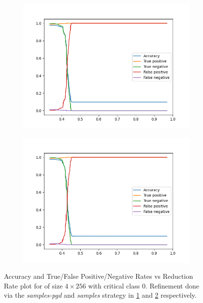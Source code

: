 \begin{figure}
    \begin{subfigure}{0.475\linewidth}
        \includegraphics[scale=0.275]{figs/mnist-compr-4-256-samples.png}
        \caption{}
        \label{f:mnist-compr-samples}
    \end{subfigure}
    \begin{subfigure}{0.475\linewidth}
        \includegraphics[scale=0.275]{figs/mnist-compr-4-256-pgd-after-samples.png}
        \caption{}
        \label{f:mnist-compr-samples-pgd}
    \end{subfigure}
    \caption{Accuracy and True/False Positive/Negative Rates vs Reduction Rate
        plot for \mnist of size $4 \times 256$ with critical class 0. Refinement
    done via the \textit{samples-pgd} and \textit{samples} strategy in
    \ref{f:mnist-compr-samples} and \ref{f:mnist-compr-samples-pgd} 
    respectively. }
    \label{f:mnist-class}
\end{figure}

